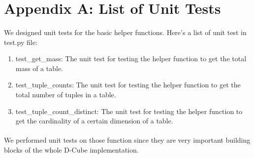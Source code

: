 \section*{Appendix A: List of Unit Tests}
\paragraph{} We designed unit tests for the basic helper functions. Here's a list of unit test in test.py file:
\begin{enumerate}
    \item test\_get\_mass: The unit test for testing the helper function to get the total mass of a table. 
    \item test\_tuple\_counts: The unit test for testing the helper function to get the total number of tuples in a table.
    \item test\_tuple\_count\_distinct: The unit test for testing the helper function to get the cardinality of a certain dimension of a table.
\end{enumerate}
\paragraph{} We performed unit tests on those function since they are very important building blocks of the whole D-Cube implementation.